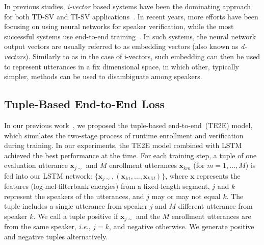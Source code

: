 \documentclass{article}
\newcommand{\vx}{\mathbf{x}}
\newcommand{\ie}{\textit{i.e.}, }
\def\x{{\mathbf x}}
\begin{document}
In previous studies, \textit{i-vector} based systems have been the
dominating approach for both TD-SV and TI-SV applications~\cite{dehak2011front}.
In recent years, more
efforts have been focusing on using neural networks for speaker
verification, while the most successful systems use
end-to-end training~\cite{variani2014deep, chen2015locally,Chao17,ZhangCZLG17,Seyed16}.
In such systems, the neural network output vectors are usually referred to as embedding vectors
(also known as \textit{d-vectors}). Similarly to as in the case of i-vectors, such embedding
can then be used to represent utterances in a fix dimensional space, in which other,
typically simpler, methods can be used to disambiguate among speakers.

\subsection{Tuple-Based End-to-End Loss}
In our previous work~\cite{heigold2016end},
we proposed the tuple-based end-to-end~(TE2E) model,
which simulates the two-stage process of runtime enrollment and verification during training.
In our experiments, the TE2E model combined with LSTM~\cite{hochreiter1997long} achieved the best performance
at the time.
For each training step, a tuple of one evaluation utterance $\vx_{j\sim}$ and $M$
enrollment utterances $\vx_{km}$ (for $m=1,\dots,M$) is fed into our LSTM network:
$\{\vx_{j\sim},(\vx_{k1},\dots, \vx_{kM})\}$,
where $\vx$ represents the features (log-mel-filterbank energies) from a fixed-length segment,
$j$ and $k$ represent the speakers of the utterances, and $j$ may or may not equal $k$.
The tuple includes a single utterance from speaker $j$ and $M$ different utterance from speaker $k$.
We call a tuple positive if $\x_{j\sim}$ and the $M$ enrollment utterances are
from the same speaker, \ie $j=k$, and negative otherwise.
We generate positive and negative tuples alternatively.
\end{document}
